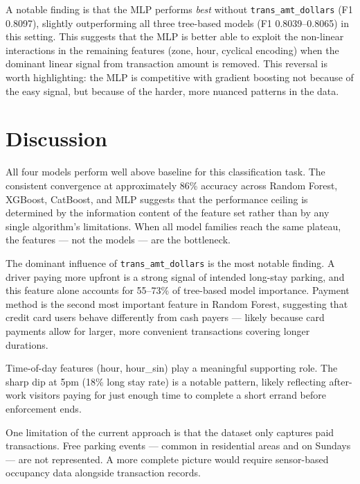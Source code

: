 \documentclass[12pt, a4paper]{article}
\begin{document}
A notable finding is that the MLP performs \textit{best} without
\texttt{trans\_amt\_dollars} (F1 0.8097), slightly outperforming all
three tree-based models (F1 0.8039--0.8065) in this setting. This
suggests that the MLP is better able to exploit the non-linear
interactions in the remaining features (zone, hour, cyclical encoding)
when the dominant linear signal from transaction amount is removed.
This reversal is worth highlighting: the MLP is competitive with
gradient boosting not because of the easy signal, but because of
the harder, more nuanced patterns in the data.

\section{Discussion}

All four models perform well above baseline for this classification
task. The consistent convergence at approximately 86\% accuracy across
Random Forest, XGBoost, CatBoost, and MLP suggests that the performance
ceiling is determined by the information content of the feature set
rather than by any single algorithm's limitations. When all model
families reach the same plateau, the features --- not the models ---
are the bottleneck.

The dominant influence of \texttt{trans\_amt\_dollars} is the most
notable finding. A driver paying more upfront is a strong signal of
intended long-stay parking, and this feature alone accounts for 55--73\%
of tree-based model importance. Payment method is the second most
important feature in Random Forest, suggesting that credit card users
behave differently from cash payers --- likely because card payments
allow for larger, more convenient transactions covering longer durations.

Time-of-day features (hour, hour\_sin) play a meaningful supporting
role. The sharp dip at 5pm (18\% long stay rate) is a notable pattern,
likely reflecting after-work visitors paying for just enough time to
complete a short errand before enforcement ends.

One limitation of the current approach is that the dataset only
captures paid transactions. Free parking events --- common in
residential areas and on Sundays --- are not represented. A more
complete picture would require sensor-based occupancy data alongside
transaction records.

\end{document}
